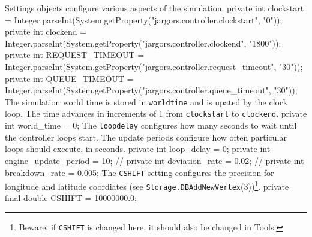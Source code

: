  Settings objects configure various aspects of the simulation.
\nwenddocs{}\endmoddef{}
private int clockstart =
    Integer.parseInt(System.getProperty("jargors.controller.clockstart", "0"));
private int clockend =
    Integer.parseInt(System.getProperty("jargors.controller.clockend", "1800"));
private int REQUEST_TIMEOUT =
    Integer.parseInt(System.getProperty("jargors.controller.request_timeout", "30"));
private int QUEUE_TIMEOUT =
    Integer.parseInt(System.getProperty("jargors.controller.queue_timeout", "30"));
\nwendcode{}\nwdocspar
The simulation world time is stored in {\tt{}world{}time} and is upated by the
clock loop. The time advances in increments of 1 from {\tt{}clockstart}
to {\tt{}clockend}.
\nwenddocs{}\plusendmoddef
private int world_time = 0;
\nwendcode{}\nwdocspar
The {\tt{}loop{}delay} configures how many seconds to wait until the controller
loops start. The update periods configure how often particular loops should
execute, in seconds.
\nwenddocs{}\plusendmoddef
private int loop_delay = 0;
private int engine_update_period = 10;
// private int deviation_rate = 0.02;
// private int breakdown_rate = 0.005;
\nwendcode{}\nwdocspar
The {\tt{}CSHIFT} setting configures the precision for longitude and latitude
coordiates (see {\tt{}Storage.\protect{}DBAddNewVertex}(3))\footnote{Beware, if {\tt{}CSHIFT}
is changed here, it should also be changed in Tools.}.
\nwenddocs{}\plusendmoddef
private final double CSHIFT = 10000000.0;

